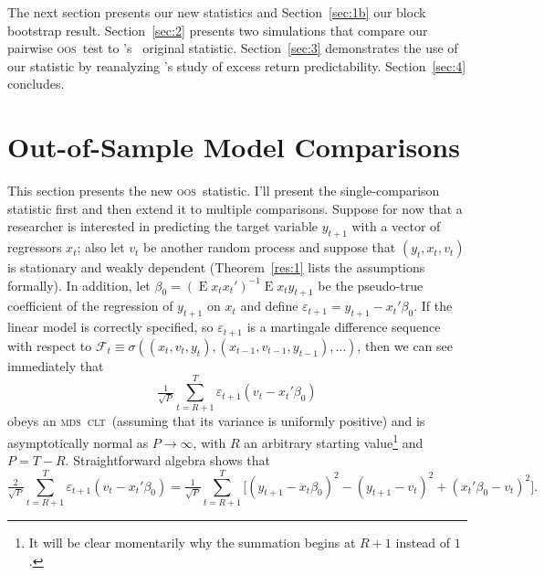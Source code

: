\documentclass[11pt,fleqn]{article}
\newcommand\citepos[2][]{\citeauthor{#2}'s \citeyearpar[#1]{#2}}
\newcommand\poscw{\citeauthor{ClW:06}'s \citeyearpar{ClW:06,ClW:07}}
\theoremstyle{definition}
\DeclareMathOperator{\E}{E}
\newcommand{\clt}{\textsc{clt}}
\newcommand{\mds}{\textsc{mds}}
\newcommand{\oos}{\textsc{oos}}
\begin{document}
The next section presents our new statistics and Section~\ref{sec:1b}
our block bootstrap result.  Section~\ref{sec:2} presents two
simulations that compare our pairwise \oos\ test to \poscw\ original
statistic.  Section~\ref{sec:3} demonstrates the use of our statistic
by reanalyzing \citepos{GoW:08} study of excess return
predictability. Section~\ref{sec:4} concludes.

\section{Out-of-Sample Model Comparisons}\label{sec:1}
This section presents the new \oos\ statistic.  I'll present the
single-comparison statistic first and then extend it to multiple
comparisons.  Suppose for now that a researcher is interested in
predicting the target variable $y_{t+1}$ with a vector of regressors
$x_t$; also let $v_t$ be another random process and suppose that
$(y_t, x_t, v_t)$ is stationary and weakly dependent
(Theorem~\ref{res:1} lists the assumptions formally).  In addition,
let $\beta_0 = (\E x_t x_t')^{-1} \E x_t y_{t+1}$ be the pseudo-true
coefficient of the regression of $y_{t+1}$ on $x_t$ and define
$\varepsilon_{t+1} = y_{t+1} - x_t'\beta_0$.  If the linear model is
correctly specified, so $\varepsilon_{t+1}$ is a martingale difference
sequence with respect to $\mathcal{F}_t \equiv \sigma((x_t, v_t, y_t),
(x_{t-1}, v_{t-1}, y_{t-1}),\dots)$, then we can see immediately that
\begin{equation}
  \label{eq:4}
  \tfrac{1}{\sqrt{P}} \sum_{t=R+1}^T \varepsilon_{t+1} (v_t - x_t'\beta_0)
\end{equation}
obeys an \mds\ \clt\ (assuming that its variance is uniformly
positive) and is asymptotically normal as $P \to \infty$, with $R$ an
arbitrary starting value\footnote{It will be clear momentarily why the
  summation begins at $R+1$ instead of $1$.} and $P = T - R$.
Straightforward algebra \citep{ClW:07} shows that
\begin{equation}
  \label{eq:5}
  \tfrac{2}{\sqrt{P}} \sum_{t=R+1}^T \varepsilon_{t+1} (v_t -
  x_t'\beta_0) = \tfrac{1}{\sqrt{P}} \sum_{t=R+1}^T \Big[(y_{t+1} - 
  x_t\beta_0)^2 - (y_{t+1} - v_t)^2 + (x_t'\beta_0 - v_t)^2 \Big].
\end{equation}
\end{document}
